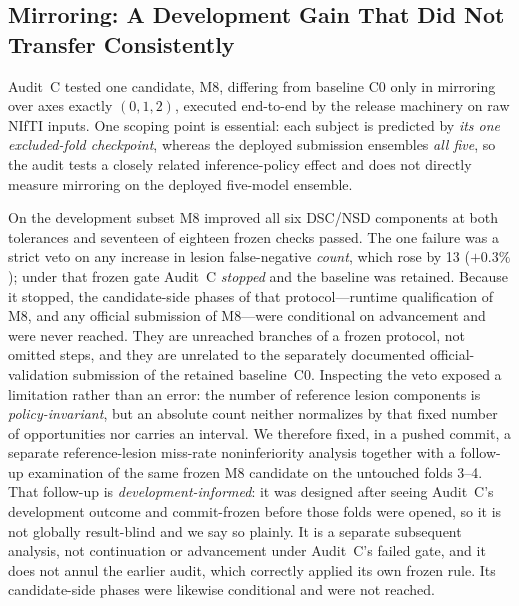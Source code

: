 \documentclass[runningheads]{llncs}
\begin{document}
\subsection{Mirroring: A Development Gain That Did Not Transfer Consistently}
\label{sec:auditc}
Audit~C tested one candidate, M8, differing from baseline C0 only in mirroring over axes exactly
$(0,1,2)$, executed end-to-end by the release machinery on raw NIfTI inputs. One scoping point is
essential: each subject is predicted by \emph{its one excluded-fold checkpoint}, whereas the deployed
submission ensembles \emph{all five}, so the audit tests a closely related inference-policy effect and
does not directly measure mirroring on the deployed five-model ensemble.

On the development subset M8 improved all six DSC/NSD components at both tolerances and seventeen of
eighteen frozen checks passed. The one failure was a strict
veto on any increase in lesion false-negative \emph{count}, which rose by 13 ($+0.3\%$); under that
frozen gate Audit~C \emph{stopped} and the baseline was retained. Because it stopped, the
candidate-side phases of that protocol---runtime qualification of M8, and any official submission of
M8---were conditional on advancement and were never reached. They are unreached branches of a frozen
protocol, not omitted steps, and they are unrelated to the separately documented official-validation
submission of the retained baseline~C0. Inspecting the veto exposed a limitation rather than an error: the number of reference lesion
components is \emph{policy-invariant}, but an absolute count neither normalizes by that fixed number
of opportunities nor carries an interval. We therefore fixed, in a pushed commit, a separate
reference-lesion miss-rate noninferiority analysis together with a follow-up examination of the same
frozen M8 candidate on the untouched folds 3--4. That
follow-up is \emph{development-informed}: it was designed after seeing Audit~C's development outcome
and commit-frozen before those folds were opened, so it is not globally result-blind and we say so
plainly. It is a separate subsequent analysis, not continuation or advancement under Audit~C's failed
gate, and it does not annul the earlier audit, which correctly applied its own frozen rule. Its
candidate-side phases were likewise conditional and were not reached.
\end{document}
